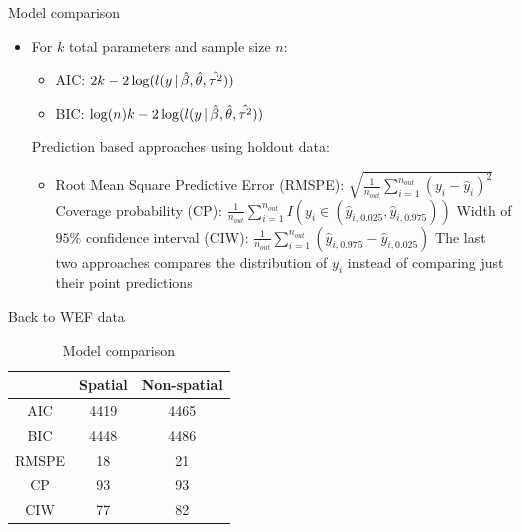 \begin{frame}{Model comparison}
	\begin{itemize}
		\item For $k$ total parameters and sample size $n$:
		\begin{itemize}
			\item \alert{AIC:} $2k - 2 \log (l(y \,|\, \hat\beta, \hat\theta, \hat{\tau^2}))$
			\item \alert{BIC:} $\log(n) k - 2 \log (l(y \,|\, \hat\beta, \hat\theta, \hat{\tau^2}))$
		\end{itemize}
		\myitem Prediction based approaches using holdout data:
		\begin{itemize}
			\item Root Mean Square Predictive Error (\alert{RMSPE}): $\sqrt{\frac 1{n_{out}}\sum_{i=1}^{n_{out}} (y_i - \hat y_i)^2}$
			\myitem Coverage probability (\alert{CP}): $\frac 1{n_{out}} \sum_{i=1}^{n_{out}} I(y_i \in (\hat y_{i,0.025}, \hat y_{i,0.975}))$
			\myitem Width of $95\%$ confidence interval (\alert{CIW}): $\frac 1{n_{out}} \sum_{i=1}^{n_{out}} (\hat y_{i,0.975}- \hat y_{i,0.025})$
			\myitem The last two approaches compares the distribution of $y_i$ instead of comparing just their point predictions
		\end{itemize}
	\end{itemize}
\end{frame}

\begin{frame}{Back to WEF data}
		\begin{table}
			\caption{Model comparison}
			\begin{tabular}{@{} ccc @{}}
				\toprule
				& Spatial & Non-spatial\\
				\midrule
				AIC & 4419 & 4465\\
				BIC & 4448 & 4486\\
				\midrule
				RMSPE & 18 & 21\\
				CP & 93 & 93\\
				CIW & 77 & 82\\
				\bottomrule
			\end{tabular}
		\end{table}
\end{frame}	


